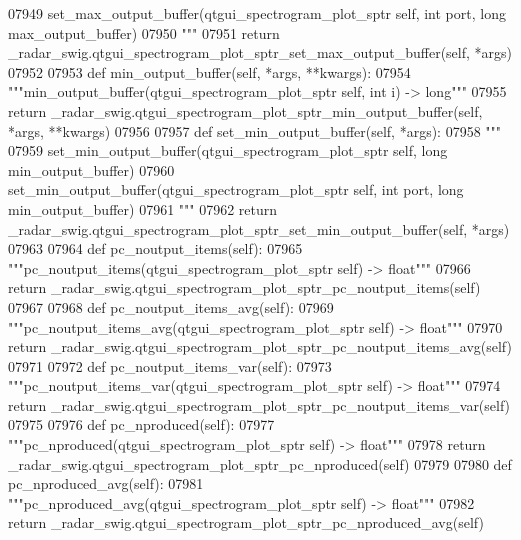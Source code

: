 \begin{DoxyCode}
{{{{{{{{{{{{{{{{{{{{{{{{{{07949 \textcolor{stringliteral}{        set\_max\_output\_buffer(qtgui\_spectrogram\_plot\_sptr self, int port, long max\_output\_buffer)}
07950 \textcolor{stringliteral}{        """}
07951         \textcolor{keywordflow}{return} \_radar\_swig.qtgui\_spectrogram\_plot\_sptr\_set\_max\_output\_buffer(self, *args)
07952 
07953     \textcolor{keyword}{def }min_output_buffer(self, *args, **kwargs):
07954         \textcolor{stringliteral}{"""min\_output\_buffer(qtgui\_spectrogram\_plot\_sptr self, int i) -> long"""}
07955         \textcolor{keywordflow}{return} \_radar\_swig.qtgui\_spectrogram\_plot\_sptr\_min\_output\_buffer(self, *args, **kwargs)
07956 
07957     \textcolor{keyword}{def }set_min_output_buffer(self, *args):
07958         \textcolor{stringliteral}{"""}
07959 \textcolor{stringliteral}{        set\_min\_output\_buffer(qtgui\_spectrogram\_plot\_sptr self, long min\_output\_buffer)}
07960 \textcolor{stringliteral}{        set\_min\_output\_buffer(qtgui\_spectrogram\_plot\_sptr self, int port, long min\_output\_buffer)}
07961 \textcolor{stringliteral}{        """}
07962         \textcolor{keywordflow}{return} \_radar\_swig.qtgui\_spectrogram\_plot\_sptr\_set\_min\_output\_buffer(self, *args)
07963 
07964     \textcolor{keyword}{def }pc_noutput_items(self):
07965         \textcolor{stringliteral}{"""pc\_noutput\_items(qtgui\_spectrogram\_plot\_sptr self) -> float"""}
07966         \textcolor{keywordflow}{return} \_radar\_swig.qtgui\_spectrogram\_plot\_sptr\_pc\_noutput\_items(self)
07967 
07968     \textcolor{keyword}{def }pc_noutput_items_avg(self):
07969         \textcolor{stringliteral}{"""pc\_noutput\_items\_avg(qtgui\_spectrogram\_plot\_sptr self) -> float"""}
07970         \textcolor{keywordflow}{return} \_radar\_swig.qtgui\_spectrogram\_plot\_sptr\_pc\_noutput\_items\_avg(self)
07971 
07972     \textcolor{keyword}{def }pc_noutput_items_var(self):
07973         \textcolor{stringliteral}{"""pc\_noutput\_items\_var(qtgui\_spectrogram\_plot\_sptr self) -> float"""}
07974         \textcolor{keywordflow}{return} \_radar\_swig.qtgui\_spectrogram\_plot\_sptr\_pc\_noutput\_items\_var(self)
07975 
07976     \textcolor{keyword}{def }pc_nproduced(self):
07977         \textcolor{stringliteral}{"""pc\_nproduced(qtgui\_spectrogram\_plot\_sptr self) -> float"""}
07978         \textcolor{keywordflow}{return} \_radar\_swig.qtgui\_spectrogram\_plot\_sptr\_pc\_nproduced(self)
07979 
07980     \textcolor{keyword}{def }pc_nproduced_avg(self):
07981         \textcolor{stringliteral}{"""pc\_nproduced\_avg(qtgui\_spectrogram\_plot\_sptr self) -> float"""}
07982         \textcolor{keywordflow}{return} \_radar\_swig.qtgui\_spectrogram\_plot\_sptr\_pc\_nproduced\_avg(self)
}}}}}}}}}}}}}}}}}}}}}}}}}}
\end{DoxyCode}
